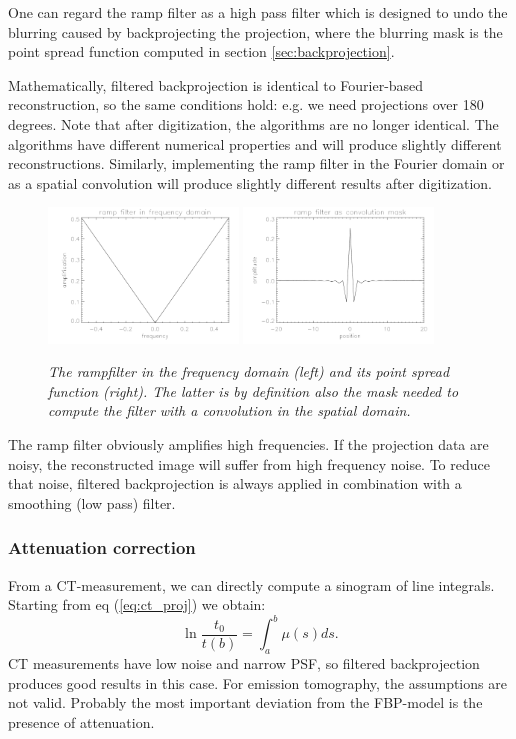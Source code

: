 One can regard the ramp filter as a high pass filter which is designed to undo
the blurring caused by backprojecting the projection, where the blurring mask
is the point spread function computed in section \ref{sec:backprojection}.

Mathematically, filtered backprojection is identical to Fourier-based
reconstruction, so the same conditions hold: e.g. we need projections over 180
degrees. Note that after digitization, the algorithms are no longer identical.
The algorithms have different numerical properties and will produce slightly
different reconstructions. Similarly, implementing the ramp filter in the
Fourier domain or as a spatial convolution will produce slightly different
results after digitization. 
%
\begin{figure}[tb]
  \includegraphics[width=0.45\textwidth]{figs/fig_rampfilter1.pdf}
  \includegraphics[width=0.45\textwidth]{figs/fig_rampfilter2.pdf}
\caption{\label{fig:rampfilter} \emph{The rampfilter in the frequency
    domain (left) and its point spread function (right). The latter is
    by definition also the mask needed to compute the filter with a
    convolution in the spatial domain.}}
\end{figure}

The ramp filter obviously amplifies high frequencies. If the
projection data are noisy, the reconstructed image will suffer from
high frequency noise. To reduce that noise, filtered backprojection is
always applied in combination with a smoothing (low pass) filter.

\subsubsection{Attenuation correction} \label{sec:attencor}
From a CT-measurement, we can directly compute a sinogram of line integrals.
Starting from eq (\ref{eq:ct_proj}) we obtain:
\begin{equation}
  \ln \frac{t_0}{t(b)} = \int_a^b \mu(s) ds. \label{eq:attencor}
\end{equation}
CT measurements have low noise and narrow PSF, so filtered backprojection
produces good results in this case. For emission tomography, the assumptions
are not valid. Probably the most important deviation from the FBP-model is the
presence of attenuation.


